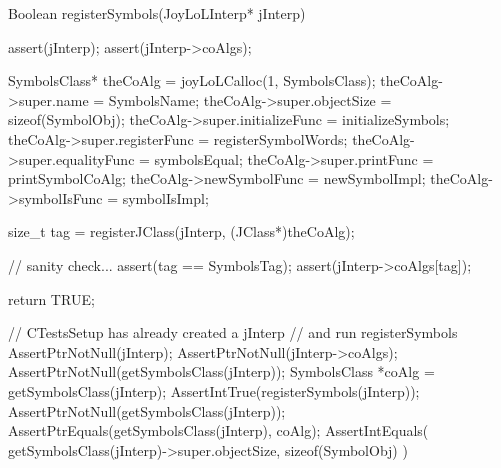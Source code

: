 \startCCode
Boolean registerSymbols(JoyLoLInterp* jInterp) {
  assert(jInterp);
  assert(jInterp->coAlgs);
  
  SymbolsClass* theCoAlg = joyLoLCalloc(1, SymbolsClass);
  theCoAlg->super.name           = SymbolsName;
  theCoAlg->super.objectSize     = sizeof(SymbolObj);
  theCoAlg->super.initializeFunc = initializeSymbols;
  theCoAlg->super.registerFunc   = registerSymbolWords;
  theCoAlg->super.equalityFunc   = symbolsEqual;
  theCoAlg->super.printFunc      = printSymbolCoAlg;
  theCoAlg->newSymbolFunc        = newSymbolImpl;
  theCoAlg->symbolIsFunc         = symbolIsImpl;

  size_t tag =
    registerJClass(jInterp, (JClass*)theCoAlg);
  
  // sanity check...
  assert(tag == SymbolsTag);
  assert(jInterp->coAlgs[tag]);

  return TRUE;
}
\stopCCode


\startCTest
  // CTestsSetup has already created a jInterp
  // and run registerSymbols
  AssertPtrNotNull(jInterp);
  AssertPtrNotNull(jInterp->coAlgs);
  AssertPtrNotNull(getSymbolsClass(jInterp));
  SymbolsClass *coAlg = getSymbolsClass(jInterp);
  AssertIntTrue(registerSymbols(jInterp));
  AssertPtrNotNull(getSymbolsClass(jInterp));
  AssertPtrEquals(getSymbolsClass(jInterp), coAlg);
  AssertIntEquals(
    getSymbolsClass(jInterp)->super.objectSize,
    sizeof(SymbolObj)
  )
\stopCTest
\stopTestCase
\stopTestSuite
